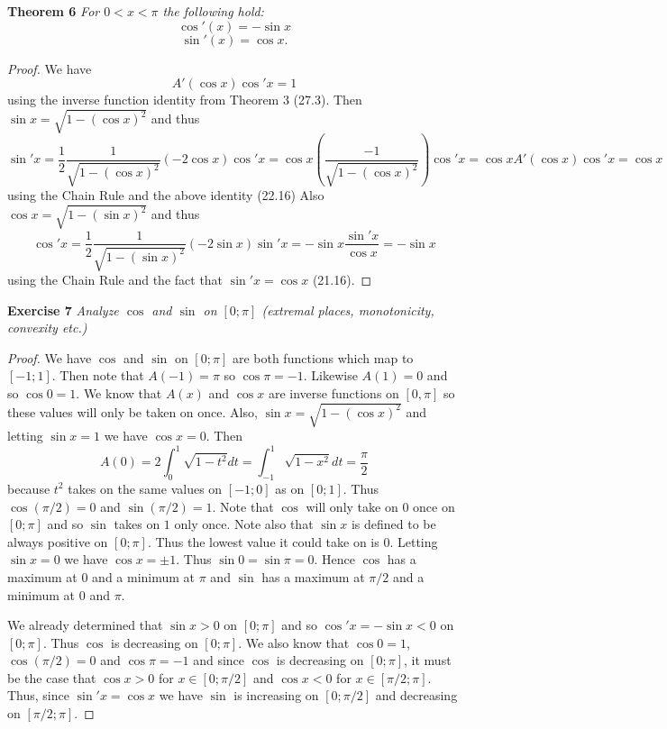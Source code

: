 \documentclass{article}
\begin{document}
\begin{flushleft}
\textbf{Theorem 6}
\textsl{For $0 < x < \pi$ the following hold:
\[
\cos' (x) = - \sin x
\]
\[
\sin' (x) = \cos x.
\]}
\begin{proof}
We have
\[
A'(\cos x) \cos' x = 1
\]
using the inverse function identity from Theorem 3 (27.3). Then $\sin x = \sqrt{1 - (\cos x)^2}$ and thus
\[
\sin' x = \frac{1}{2} \frac{1}{\sqrt{1-(\cos x)^2}} (-2 \cos x) \cos' x = \cos x \left ( \frac{-1}{\sqrt{1-(\cos x)^2}} \right ) \cos ' x = \cos x A' (\cos x) \cos' x = \cos x
\]
using the Chain Rule and the above identity (22.16)
Also $\cos x = \sqrt{1 - (\sin x)^2}$ and thus
\[
\cos' x = \frac{1}{2} \frac{1}{\sqrt{1-(\sin x)^2}} (-2 \sin x) \sin' x = - \sin x \frac{\sin' x}{\cos x} = - \sin x
\]
using the Chain Rule and the fact that $\sin' x = \cos x$ (21.16).
\end{proof}

\textbf{Exercise 7}
\textsl{Analyze $\cos$ and $\sin$ on $[0;\pi]$ (extremal places, monotonicity, convexity etc.)}
\begin{proof}
We have $\cos$ and $\sin$ on $[0;\pi]$ are both functions which map to $[-1;1]$. Then note that $A(-1) = \pi$ so $\cos \pi = -1$. Likewise $A(1) = 0$ and so $\cos 0 = 1$. We know that $A(x)$ and $\cos x$ are inverse functions on $[0,\pi]$ so these values will only be taken on once. Also, $\sin x = \sqrt{1-(\cos x)^2}$ and letting $\sin x = 1$ we have $\cos x = 0$. Then
\[
A(0) = 2 \int_0^1 \sqrt{1-t^2} dt = \int_{-1}^1 \sqrt{1-x^2} dt = \frac{\pi}{2}
\]
because $t^2$ takes on the same values on $[-1;0]$ as on $[0;1]$. Thus $\cos (\pi/2) = 0$ and $\sin (\pi/2) = 1$. Note that $\cos$ will only take on $0$ once on $[0;\pi]$ and so $\sin$ takes on $1$ only once. Note also that $\sin x$ is defined to be always positive on $[0;\pi]$. Thus the lowest value it could take on is $0$. Letting $\sin x = 0$ we have $\cos x = \pm 1$. Thus $\sin 0 = \sin \pi = 0$. Hence $\cos$ has a maximum at $0$ and a minimum at $\pi$ and $\sin$ has a maximum at $\pi/2$ and a minimum at $0$ and $\pi$.\newline

We already determined that $\sin x > 0$ on $[0;\pi]$ and so $\cos' x = -\sin x < 0$ on $[0;\pi]$. Thus $\cos$ is decreasing on $[0;\pi]$. We also know that $\cos 0 = 1$, $\cos (\pi/2) = 0$ and $\cos \pi = -1$ and since $\cos$ is decreasing on $[0; \pi]$, it must be the case that $\cos x > 0$ for $x \in [0;\pi/2]$ and $\cos x < 0$ for $x \in [\pi/2;\pi]$. Thus, since $\sin' x = \cos x$ we have $\sin$ is increasing on $[0;\pi/2]$ and decreasing on $[\pi/2; \pi]$.\newline


\end{proof}
\end{flushleft}
\end{document}
